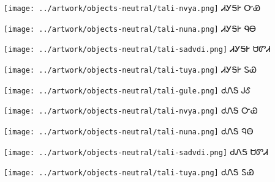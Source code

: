 \documentclass[avery5371]{flashcards}%
\begin{document}
\begin{flashcard}{
\texttt{[image: ../artwork/objects-neutral/tali-nvya.png]}
}\Huge ᏗᎩᎦᎨ ᏅᏯ
\end{flashcard}

\begin{flashcard}{
\texttt{[image: ../artwork/objects-neutral/tali-nuna.png]}
}\Huge ᏗᎩᎦᎨ ᏄᎾ
\end{flashcard}

\begin{flashcard}{
\texttt{[image: ../artwork/objects-neutral/tali-sadvdi.png]}
}\Huge ᏗᎩᎦᎨ ᏌᏛᏗ
\end{flashcard}

\begin{flashcard}{
\texttt{[image: ../artwork/objects-neutral/tali-tuya.png]}
}\Huge ᏗᎩᎦᎨ ᏚᏯ
\end{flashcard}

\begin{flashcard}{
\texttt{[image: ../artwork/objects-neutral/tali-gule.png]}
}\Huge ᏧᏁᎦ ᎫᎴ
\end{flashcard}

\begin{flashcard}{
\texttt{[image: ../artwork/objects-neutral/tali-nvya.png]}
}\Huge ᏧᏁᎦ ᏅᏯ
\end{flashcard}

\begin{flashcard}{
\texttt{[image: ../artwork/objects-neutral/tali-nuna.png]}
}\Huge ᏧᏁᎦ ᏄᎾ
\end{flashcard}

\begin{flashcard}{
\texttt{[image: ../artwork/objects-neutral/tali-sadvdi.png]}
}\Huge ᏧᏁᎦ ᏌᏛᏗ
\end{flashcard}

\begin{flashcard}{
\texttt{[image: ../artwork/objects-neutral/tali-tuya.png]}
}\Huge ᏧᏁᎦ ᏚᏯ
\end{flashcard}
\end{document}
